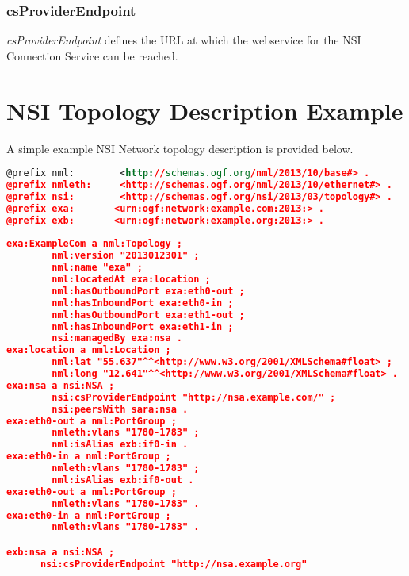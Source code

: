 \documentclass[12pt]{article}  %
\begin{document}
\subsubsection{csProviderEndpoint} %
\label{ssub:csproviderendpoint}

\emph{csProviderEndpoint} defines the URL at which the webservice for the NSI Connection Service can be reached.


\section{NSI Topology Description Example}

 A simple example NSI Network topology description is provided 
below. 

\begin{lstlisting}[language=XML]
@prefix nml:        <http://schemas.ogf.org/nml/2013/10/base#> .
@prefix nmleth:     <http://schemas.ogf.org/nml/2013/10/ethernet#> .
@prefix nsi:        <http://schemas.ogf.org/nsi/2013/03/topology#> .
@prefix exa:       <urn:ogf:network:example.com:2013:> .
@prefix exb:       <urn:ogf:network:example.org:2013:> .
  
exa:ExampleCom a nml:Topology ;
        nml:version "2013012301" ;
        nml:name "exa" ;
        nml:locatedAt exa:location ;
        nml:hasOutboundPort exa:eth0-out ;
        nml:hasInboundPort exa:eth0-in ;
        nml:hasOutboundPort exa:eth1-out ;
        nml:hasInboundPort exa:eth1-in ;
        nsi:managedBy exa:nsa .
exa:location a nml:Location ;
        nml:lat "55.637"^^<http://www.w3.org/2001/XMLSchema#float> ;
        nml:long "12.641"^^<http://www.w3.org/2001/XMLSchema#float> .
exa:nsa a nsi:NSA ;
        nsi:csProviderEndpoint "http://nsa.example.com/" ;
        nsi:peersWith sara:nsa .
exa:eth0-out a nml:PortGroup ;
        nmleth:vlans "1780-1783" ;
        nml:isAlias exb:if0-in .
exa:eth0-in a nml:PortGroup ;
        nmleth:vlans "1780-1783" ;
        nml:isAlias exb:if0-out .
exa:eth0-out a nml:PortGroup ;
        nmleth:vlans "1780-1783" .
exa:eth0-in a nml:PortGroup ;
        nmleth:vlans "1780-1783" .

exb:nsa a nsi:NSA ;
      nsi:csProviderEndpoint "http://nsa.example.org"
\end{lstlisting}
\end{document}
